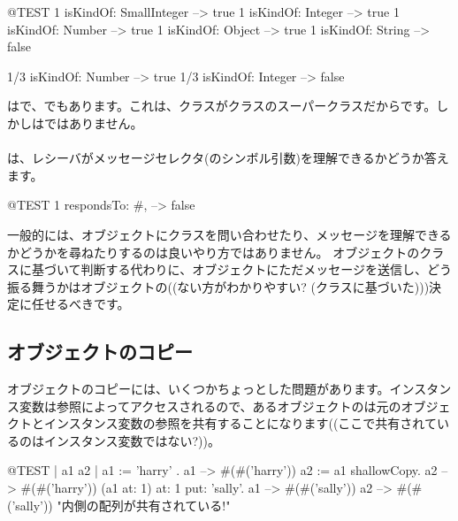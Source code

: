 \documentclass[a4paper,10pt,twoside]{book}
\begin{document}
\begin{code}{@TEST}
1 isKindOf: SmallInteger --> true
1 isKindOf: Integer          --> true
1 isKindOf: Number         --> true
1 isKindOf: Object           --> true
1 isKindOf: String            --> false

1/3 isKindOf: Number      --> true
1/3 isKindOf: Integer        --> false
\end{code}

はで、でもあります。これは、クラスがクラスのスーパークラスだからです。しかしはではありません。

\paragraph{}
は、レシーバがメッセージセレクタ(のシンボル引数)を理解できるかどうか答えます。

\begin{code}{@TEST}
1 respondsTo: #, --> false
\end{code}

一般的には、オブジェクトにクラスを問い合わせたり、メッセージを理解できるかどうかを尋ねたりするのは良いやり方ではありません。
オブジェクトのクラスに基づいて判断する代わりに、オブジェクトにただメッセージを送信し、どう振る舞うかはオブジェクトの((ない方がわかりやすい? (\ie クラスに基づいた)))決定に任せるべきです。

\subsection{オブジェクトのコピー}

オブジェクトのコピーには、いくつかちょっとした問題があります。インスタンス変数は参照によってアクセスされるので、あるオブジェクトのは元のオブジェクトとインスタンス変数の参照を共有することになります((ここで共有されているのはインスタンス変数ではない?))。

\begin{code}{@TEST | a1 a2 |}
a1 := { { 'harry' } }.
a1 --> #(#('harry'))
a2 := a1 shallowCopy.
a2 --> #(#('harry'))
(a1 at: 1) at: 1 put: 'sally'.
a1 --> #(#('sally'))
a2 --> #(#('sally'))    "内側の配列が共有されている!"
\end{code}
\end{document}
